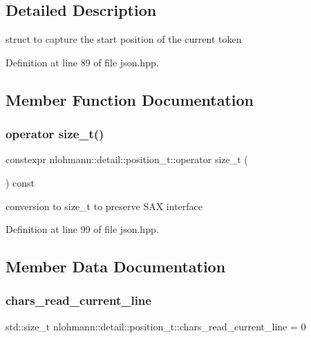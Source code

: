 \subsection{Detailed Description}
struct to capture the start position of the current token 

Definition at line 89 of file json.\+hpp.



\subsection{Member Function Documentation}
\mbox{\label{structnlohmann_1_1detail_1_1position__t_ac9ad1e0f143f162e2e0c979cd678d683}} 
\subsubsection{\texorpdfstring{operator size\_t()}{operator size\_t()}}
{\footnotesize\ttfamily constexpr nlohmann\+::detail\+::position\+\_\+t\+::operator size\+\_\+t (\begin{DoxyParamCaption}{ }\end{DoxyParamCaption}) const\hspace{0.3cm}{\ttfamily [inline]}}



conversion to size\+\_\+t to preserve S\+AX interface 



Definition at line 99 of file json.\+hpp.



\subsection{Member Data Documentation}
\mbox{\label{structnlohmann_1_1detail_1_1position__t_a74df94563dd32102152ceb8c6d9041d8}} 
\subsubsection{\texorpdfstring{chars\_read\_current\_line}{chars\_read\_current\_line}}
{\footnotesize\ttfamily std\+::size\+\_\+t nlohmann\+::detail\+::position\+\_\+t\+::chars\+\_\+read\+\_\+current\+\_\+line = 0}



